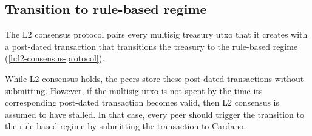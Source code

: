 \documentclass[../hydrozoa.tex]{subfiles}
\begin{document}
\subsection{Transition to rule-based regime}%
\label{h:rule-based-transition}

The L2 consensus protocol pairs every multisig treasury utxo that it creates with a post-dated transaction that transitions the treasury to the rule-based regime (\cref{h:l2-consensus-protocol}).

While L2 consensus holds, the peers store these post-dated transactions without submitting.
However, if the multisig utxo is not spent by the time its corresponding post-dated transaction becomes valid, then L2 consensus is assumed to have stalled.
In that case, every peer should trigger the transition to the rule-based regime by submitting the transaction to Cardano.
\end{document}

